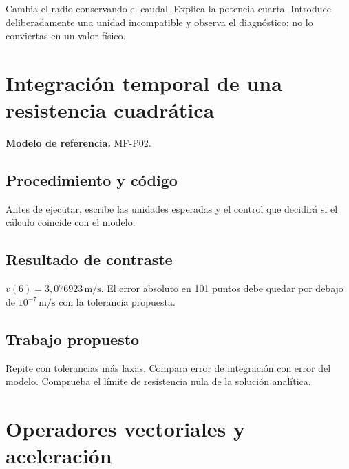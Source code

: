 Cambia el radio conservando el caudal. Explica la potencia cuarta. Introduce deliberadamente una unidad incompatible y observa el diagnóstico; no lo conviertas en un valor físico.

\studiumchaptercheck

\chapter{Integración temporal de una resistencia cuadrática}


\textbf{Modelo de referencia.} MF-P02.\par

\section{Procedimiento y código}

Antes de ejecutar, escribe las unidades esperadas y el control que decidirá si el cálculo coincide con el modelo.



\section{Resultado de contraste}

$v(6)=3{,}076923\,\mathrm{m/s}$. El error absoluto en 101 puntos debe quedar por debajo de $10^{-7}\,\mathrm{m/s}$ con la tolerancia propuesta.

\section{Trabajo propuesto}

Repite con tolerancias más laxas. Compara error de integración con error del modelo. Comprueba el límite de resistencia nula de la solución analítica.

\studiumchaptercheck

\chapter{Operadores vectoriales y aceleración}


